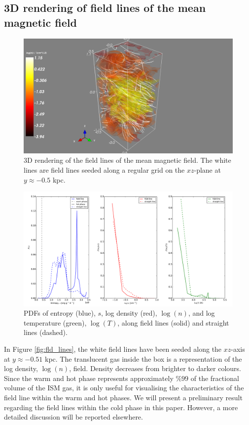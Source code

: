 \documentclass[useAMS,usenatbib]{mn2e}
\begin{document}
\subsection{3D rendering of field lines of the mean magnetic field}
\begin{figure}
  \vspace{0cm}
  \centering
\hspace*{0cm} \includegraphics[width=\linewidth]{snapshot1.png}
\hspace*{0cm} \caption{3D rendering of the field lines of the mean magnetic field. The white lines are field lines seeded along a regular grid on the $xz$-plane at $y\approx-0.5$ kpc. 
  \label{fig:fld_lines}}
  \end{figure}
\begin{figure}[h]
\centering
\includegraphics[width=\linewidth]{sline_vs_fld1.pdf}
\caption{PDFs of entropy (blue), $s$, log density (red), $\log(n)$, and log temperature (green), $\log(T)$, along field lines (solid) and straight lines (dashed).}
\label{fig:pdfs_mean}
\end{figure}
In Figure \vref{fig:fld_lines}, the white field lines have been seeded along the $xz$-axis at $y\approx-0.51$ kpc. The translucent gas inside the box is a representation of the log density, $\log(n)$, field. Density decreases from brighter to darker colours. Since the warm and hot phase represents approximately $\%99$ of the fractional volume of the ISM gas, it is only useful for visualising the characteristics of the field line within the warm and hot phases. We will present a preliminary result regarding the field lines within the cold phase in this paper. However, a more detailed discussion will be reported elsewhere. 
\end{document}
